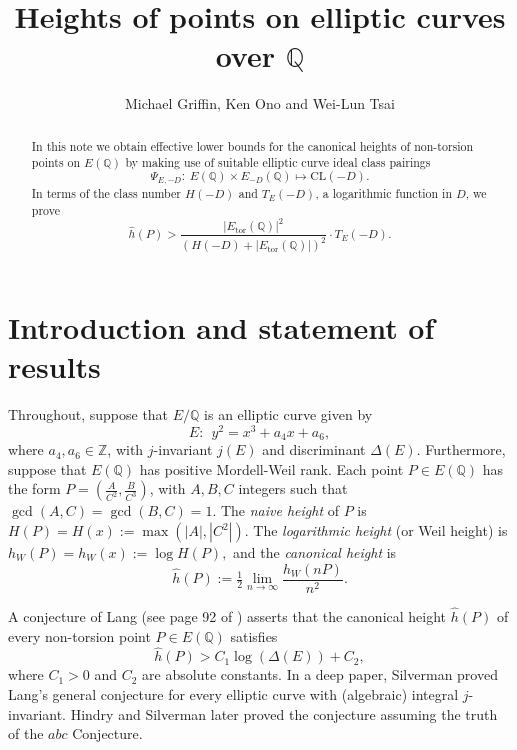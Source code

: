\documentclass[12pt]{amsart}
\newcommand{\CL}{\mathrm{CL}}
\newcommand{\Z}{\mathbb{Z}}
\newcommand{\Q}{\mathbb{Q}}
\newcommand{\tor}{\mathrm{tor}}
\numberwithin{equation}{section}
\begin{document}
\title[Heights of points on elliptic curves over $\Q$]{Heights of points on elliptic curves over $\Q$}
\author{Michael Griffin, Ken Ono and Wei-Lun Tsai}
\address{Department of Mathematics, 275 TMCB, Brigham Young University, Provo, UT 84602}
\address{Department of Mathematics, University of Virginia, Charlottesville, VA 22904}


\begin{abstract}   
In this note we obtain effective lower bounds for the canonical heights of non-torsion points
on $E(\Q)$ by making use of suitable elliptic curve ideal class pairings
$$\Psi_{E,-D}: \ E(\Q)\times E_{-D}(\Q)\mapsto \CL(-D).$$
In terms of the class number $H(-D)$  and $T_E(-D)$, a logarithmic function in $D$, 
we prove 
$$
\widehat{h}(P)> \frac{|E_{\tor}(\Q)|^2}{\left( H(-D)+ |E_{\tor}(\Q)|\right)^2}\cdot T_E(-D).
$$

\end{abstract}

\maketitle
\section{Introduction and statement of results}\label{Intro}
 
Throughout, suppose that $E/\Q$ is an elliptic curve given by
\begin{equation}\label{EModel}
E: \ \ y^2 = x^3 +a_4x +a_6,
\end{equation}
where $a_4, a_6\in \Z$, with $j$-invariant $j(E)$ and discriminant $\Delta(E).$ Furthermore, suppose that $E(\Q)$ has positive Mordell-Weil rank.
Each  point $P\in E(\Q)$ has the form $P=(\frac{A}{C^2},\frac{B}{C^3})$, with $A,B,C$ integers such that $\gcd(A,C)=\gcd(B,C)=1$. The {\it naive height} of $P$ is
$H(P)=H(x):=\max(|A|, |C^2|).$ 
The {\it logarithmic height} (or Weil height) is 
$h_W(P)= h_W(x):=\log H(P),$
and the {\it canonical height} is 
\begin{equation}
\widehat h(P):= \tfrac{1}{2}\lim_{n\to \infty}\frac{h_W(nP)}{n^2}.
\end{equation}


A conjecture of Lang  (see page 92 of \cite{Lang}) asserts that the canonical height $\widehat{h}(P)$ of every non-torsion point
$P\in E(\Q)$ satisfies
\begin{equation}\label{LangLowerBound}
\widehat{h}(P)> C_1 \log(\Delta(E)) + C_2,
\end{equation}
where $C_1>0$ and $C_2$ are absolute constants.
In a deep paper, Silverman \cite{Silverman81} proved Lang's general conjecture for every elliptic curve with (algebraic) integral $j$-invariant. Hindry and Silverman \cite{HindrySilverman} later proved the conjecture assuming the truth of the $abc$ Conjecture.
\end{document}
